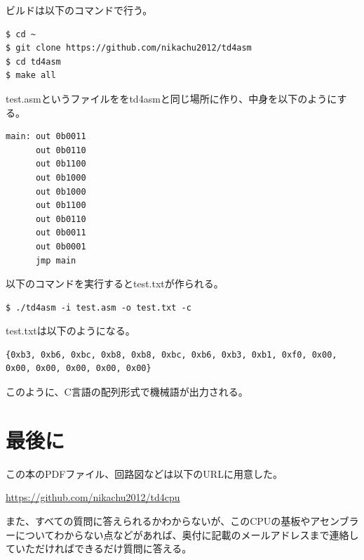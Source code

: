 \documentclass[xelatex,a5paper,ja=standard, openany]{bxjsbook}
\begin{document}
ビルドは以下のコマンドで行う。
\begin{lstlisting}
$ cd ~
$ git clone https://github.com/nikachu2012/td4asm
$ cd td4asm
$ make all
\end{lstlisting}

test.asmというファイルををtd4asmと同じ場所に作り、中身を以下のようにする。
\begin{lstlisting}[caption=LEDちかちかさせるプログラム \texttt{test.asm}]
main: out 0b0011
      out 0b0110
      out 0b1100
      out 0b1000
      out 0b1000
      out 0b1100
      out 0b0110
      out 0b0011
      out 0b0001
      jmp main
\end{lstlisting}

以下のコマンドを実行するとtest.txtが作られる。
\begin{lstlisting}
$ ./td4asm -i test.asm -o test.txt -c
\end{lstlisting}

test.txtは以下のようになる。
\begin{lstlisting}
{0xb3, 0xb6, 0xbc, 0xb8, 0xb8, 0xbc, 0xb6, 0xb3, 0xb1, 0xf0, 0x00, 0x00, 0x00, 0x00, 0x00, 0x00}
\end{lstlisting}

このように、C言語の配列形式で機械語が出力される。

\chapter{最後に}

この本のPDFファイル、回路図などは以下のURLに用意した。

\centerline{\url{https://github.com/nikachu2012/td4cpu}}

また、すべての質問に答えられるかわからないが、このCPUの基板やアセンブラーについてわからない点などがあれば、奥付に記載のメールアドレスまで連絡していただければできるだけ質問に答える。

\vspace*{\fill}
\end{document}
